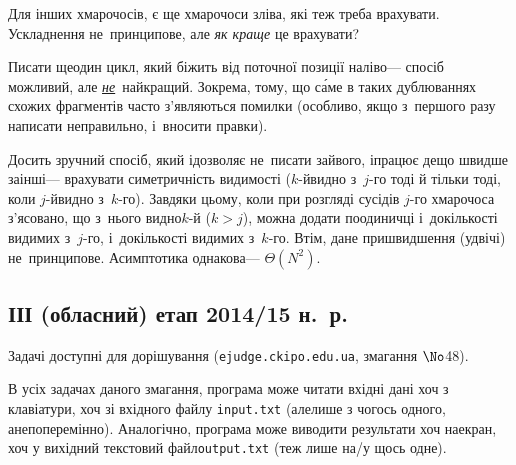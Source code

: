 \documentclass[14pt,a4paper]{extarticle}
\begin{document}
Для інших хмарочосів, є ще хмарочоси зліва, які теж треба врахувати. Ускладнення не~принципове, але \emph{як краще} це врахувати?

Писати ще\nolinebreak[3] один цикл, який біжить від поточної позиції наліво\nolinebreak[3] --- спосіб можливий, але \underline{\emph{не}}~найкращий. Зокрема, тому, що с\'{а}ме в таких дублюваннях схожих фрагментів часто з'являються помилки (особливо, якщо з~першого разу написати неправильно, і~вносити правки).

Досить зручний спосіб, який і\nolinebreak[3] дозволяє не~писати зайвого, і\nolinebreak[3] працює дещо швидше за\nolinebreak[2] інші\nolinebreak[3] --- врахувати симетричність видимості (\mbox{$k$-й}\nolinebreak[3] видно з~\mbox{$j$-го} тоді й тільки тоді, коли \mbox{$j$-й}\nolinebreak[3] видно з~\mbox{$k$-го}). Завдяки цьому, коли при розгляді сусідів \mbox{$j$-го} хмарочоса з'ясовано, що з~нього видно\nolinebreak[2] \mbox{$k$-й} (${k{>}j}$), можна додати по\nolinebreak[3] одиничці і~до\nolinebreak[2] кількості видимих з~\mbox{$j$-го}, і~до\nolinebreak[2] кількості видимих з~\mbox{$k$-го}.
Втім, дане пришвидшення (удвічі) не~принципове. Асимптотика однакова\nolinebreak[3] --- $\Theta(N^2)$.






\renewenvironment{problemAllDefault}[1]{\vspace{10mm}\par\begin{problem}{#1}{\stdinOrInputTxt}{\stdoutOrOutputTxt}{1 сек}{64 мегабайти}}{\end{problem}}

\subsection{ІІІ (обласний) етап 2014/15 н.~р.}

Задачі доступні для дорішування (\verb"ejudge.ckipo.edu.ua", змагання $\No$48).

В усіх задачах даного змагання, програма може читати вхідні дані хоч з клавіатури, хоч зі вхідного файлу \verb"input.txt" (але\nolinebreak[2] лише з чогось одного, а\nolinebreak[3] не\nolinebreak[2] поперемінно). Аналогічно, програма може виводити результати хоч на\nolinebreak[3] екран, хоч у вихідний текстовий файл\nolinebreak[2] \verb"output.txt" (теж лише на/у щось одне).
\end{document}
